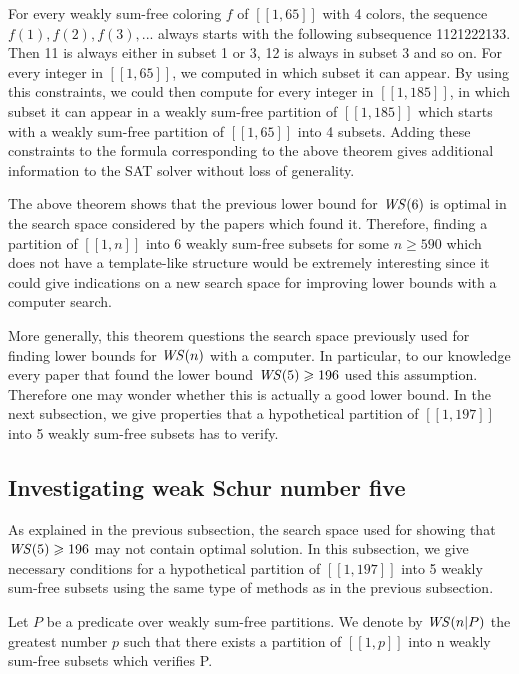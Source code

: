 \par
For every weakly sum-free coloring \(f\) of \([\![1,65]\!]\) with 4 colors, the sequence \(f(1), f(2), f(3), ...\) always
starts with the following subsequence 1121222133. Then 11 is always
either in subset 1 or 3, 12 is always in subset 3 and so on. For every integer in \([\![1,65]\!]\), we computed in which
subset it can appear.
By using this constraints, we could then compute for every integer in \([\![1,185]\!]\), in which subset it can appear
in a weakly sum-free
partition of \([\![1,185]\!]\) which starts with a weakly sum-free partition of \([\![1,65]\!]\) into 4 subsets. Adding
these constraints to the
formula corresponding to the above theorem gives additional information to the SAT solver without loss of generality.

\par
The above theorem shows that the previous lower bound for \(\mathit{WS} (6)\) is optimal in the search space considered by the
papers which found it.
Therefore, finding a partition of \([\![1,n]\!]\) into 6 weakly sum-free subsets for some \(n \geqslant 590\) which does
not have a template-like structure
would be extremely interesting since it could give indications on a new search space for improving lower bounds with a
computer search. 

\par More generally, this theorem questions the search space previously used for finding lower bounds for \(\mathit{WS} (n)\) 
with a computer. In particular, to our knowledge every paper that found the lower bound \(\mathit{WS} (5) \geqslant 196\) 
used this assumption. Therefore one may wonder whether this is actually a good lower bound. In the next subsection, we give 
properties that a hypothetical partition of \([\![1,197]\!]\) into 5 weakly sum-free subsets has to verify.


\subsection{Investigating weak Schur number five}

\qquad As explained in the previous subsection, the search space used for showing that \(\mathit{WS} (5) \geqslant 196\) may not contain
optimal solution. In this subsection,
we give necessary conditions for a hypothetical partition of \([\![1,197]\!]\) into 5 weakly sum-free subsets using the
same type of methods as in the
previous subsection.

\begin{notation}
Let \(P\) be a predicate over weakly sum-free partitions. We denote by \(\mathit{WS} (n | P)\) the greatest number \(p\) such that
there exists a partition of
\([\![1,p]\!]\) into n weakly sum-free subsets which verifies P.
\end{notation}

